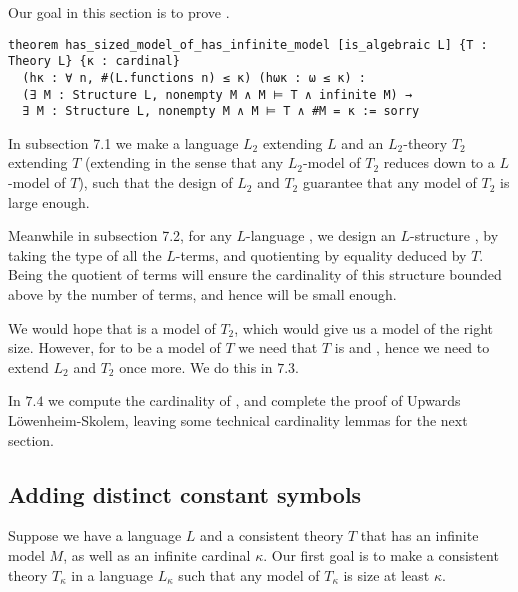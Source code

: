 Our goal in this section is to prove
.

\begin{lstlisting}
theorem has_sized_model_of_has_infinite_model [is_algebraic L] {T : Theory L} {κ : cardinal}
  (hκ : ∀ n, #(L.functions n) ≤ κ) (hωκ : ω ≤ κ) :
  (∃ M : Structure L, nonempty M ∧ M ⊨ T ∧ infinite M) →
  ∃ M : Structure L, nonempty M ∧ M ⊨ T ∧ #M = κ := sorry \end{lstlisting}

In subsection 7.1 we make a language $L_{2}$ extending $L$ and an $L_{2}$-theory $T_{2}$ extending $T$
(extending in the sense that any $L_{2}$-model of $T_{2}$ reduces down to a $L$-model of $T$),
such that the design of $L_{2}$ and $T_{2}$ guarantee that any model of $T_{2}$ is large enough.

Meanwhile in subsection 7.2, for any $L$-language ,
we design an $L$-structure ,
by taking the type of all the $L$-terms,
and quotienting by equality deduced by $T$.
Being the quotient of terms will ensure the cardinality of this
structure bounded above by the number of terms,
and hence  will be small enough.

We would hope that  is a model of $T_{2}$,
which would give us a model of the right size.
However, for  to be a model of $T$ we need that $T$
is 
and , hence we need to extend $L_{2}$ and $T_{2}$ once more.
We do this in $7.3$.

In $7.4$ we compute the cardinality of ,
and complete the proof of Upwards L\"{o}wenheim-Skolem,
leaving some technical cardinality lemmas for the next section.

\subsection{Adding distinct constant symbols}

Suppose we have a language $L$ and a consistent theory $T$ that has
an infinite model $M$, as well as an infinite cardinal $\kappa$.
Our first goal is to make a consistent theory $T_\kappa$
in a language $L_{\kappa}$ such that any model of $T_{\kappa}$
is size at least $\kappa$.


